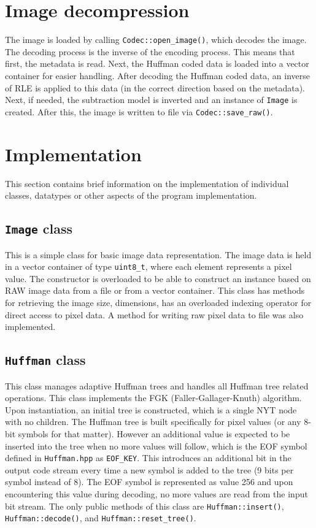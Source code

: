\documentclass[pdftex, 11pt, a4paper, titlepage]{article}
\newcommand{\code}{\texttt}
\begin{document}
    \section{Image decompression} \label{sec:decompression}
    The image is loaded by calling \code{Codec::open\_image()}, which decodes the image.
    The decoding process is the inverse of the encoding process. This means that first, the metadata
    is read. Next, the Huffman coded data is loaded into a vector container for easier handling.
    After decoding the Huffman coded data, an inverse of RLE is applied to this data (in the correct
    direction based on the metadata). Next, if needed, the subtraction model is inverted and an instance
    of \code{Image} is created. After this, the image is written to file via \code{Codec::save\_raw()}.

    \section{Implementation}
    This section contains brief information on the implementation of individual classes, datatypes
    or other aspects of the program implementation.

    \subsection{\code{Image} class} \label{sec:Image_class}
    This is a simple class for basic image data representation. The image data is held in a vector
    container of type \code{uint8\_t}, where each element represents a pixel value. The constructor is
    overloaded to be able to construct an instance based on RAW image data from a file or from a vector
    container. This class has
    methods for retrieving the image size, dimensions, has an overloaded indexing operator for direct
    access to pixel data. A method for writing raw pixel data to file was also implemented.

    \subsection{\code{Huffman} class} \label{sec:Huffman_class}
    This class manages adaptive Huffman trees and handles all Huffman tree related operations. This class
    implements the FGK (Faller-Gallager-Knuth) algorithm. Upon
    instantiation, an initial tree is constructed, which is a single NYT node with no children. The Huffman tree
    is built specifically for pixel values (or any 8-bit symbols for that matter). However an additional
    value is expected to be inserted into the tree when no more values will follow, which is the EOF symbol
    defined in \code{Huffman.hpp} as \code{EOF\_KEY}. This introduces an additional bit in the
    output code stream every time a new symbol is added to the tree (9 bits per symbol instead of 8).
    The EOF symbol is represented as value 256 and upon encountering this value during decoding, no more
    values are read from the input bit stream. The only public methods of this class are \code{Huffman::insert()},
    \code{Huffman::decode()}, and \code{Huffman::reset\_tree()}.
\end{document}
